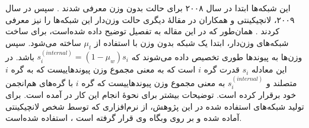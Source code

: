 این شبکه‌ها ابتدا در سال ۲۰۰۸ برای حالت بدون وزن معرفی شدند \cite{lancichinetti2008benchmark}. سپس در سال ۲۰۰۹، لانچیکینتی و همکاران در مقالهٔ دیگری حالت وزن‌دار این شبکه‌ها را نیز معرفی کردند \cite{lancichinetti2009benchmarks}. همان‌طور که در این مقاله به تفصیل توضیح داده شده‌است، برای ساخت شبکه‌های  وزن‌دار، ابتدا یک شبکه  بدون وزن با استفاده از $\mu_t$ ساخته می‌شود. سپس وزن‌ها به پیوندها طوری تخصیص داده می‌شوند که $s_i^{(internal)} = (1 - \mu_w)s_i$ باشد. در این معادله $s_i$ قدرت گره $i$ است که به معنی مجموع وزن پیوندهاییست که به گره $i$ متصلند و $s_i^{(internal)}$ به معنی مجموع وزن پیوندهاییست که گره $i$ با گره‌های هم‌انجمن خود برقرار کرده است. توضیحات بیشتر برای نحوهٔ انجام این کار در \cite{lancichinetti2009benchmarks} آمده است. برای تولید شبکه‌های استفاده شده در این پژوهش، از نرم‌افزاری که توسط شخص لانچیکینتی آماده شده و بر روی وبگاه وی قرار گرفته است \cite{lfrweb}، استفاده شده‌است.
